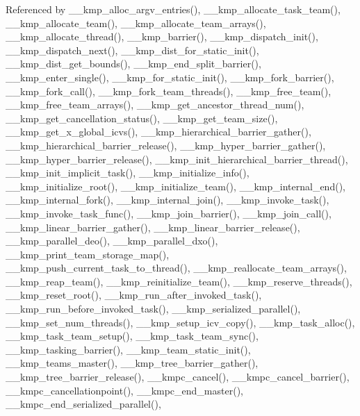 Referenced by \-\_\-\-\_\-kmp\-\_\-alloc\-\_\-argv\-\_\-entries(), \-\_\-\-\_\-kmp\-\_\-allocate\-\_\-task\-\_\-team(), \-\_\-\-\_\-kmp\-\_\-allocate\-\_\-team(), \-\_\-\-\_\-kmp\-\_\-allocate\-\_\-team\-\_\-arrays(), \-\_\-\-\_\-kmp\-\_\-allocate\-\_\-thread(), \-\_\-\-\_\-kmp\-\_\-barrier(), \-\_\-\-\_\-kmp\-\_\-dispatch\-\_\-init(), \-\_\-\-\_\-kmp\-\_\-dispatch\-\_\-next(), \-\_\-\-\_\-kmp\-\_\-dist\-\_\-for\-\_\-static\-\_\-init(), \-\_\-\-\_\-kmp\-\_\-dist\-\_\-get\-\_\-bounds(), \-\_\-\-\_\-kmp\-\_\-end\-\_\-split\-\_\-barrier(), \-\_\-\-\_\-kmp\-\_\-enter\-\_\-single(), \-\_\-\-\_\-kmp\-\_\-for\-\_\-static\-\_\-init(), \-\_\-\-\_\-kmp\-\_\-fork\-\_\-barrier(), \-\_\-\-\_\-kmp\-\_\-fork\-\_\-call(), \-\_\-\-\_\-kmp\-\_\-fork\-\_\-team\-\_\-threads(), \-\_\-\-\_\-kmp\-\_\-free\-\_\-team(), \-\_\-\-\_\-kmp\-\_\-free\-\_\-team\-\_\-arrays(), \-\_\-\-\_\-kmp\-\_\-get\-\_\-ancestor\-\_\-thread\-\_\-num(), \-\_\-\-\_\-kmp\-\_\-get\-\_\-cancellation\-\_\-status(), \-\_\-\-\_\-kmp\-\_\-get\-\_\-team\-\_\-size(), \-\_\-\-\_\-kmp\-\_\-get\-\_\-x\-\_\-global\-\_\-icvs(), \-\_\-\-\_\-kmp\-\_\-hierarchical\-\_\-barrier\-\_\-gather(), \-\_\-\-\_\-kmp\-\_\-hierarchical\-\_\-barrier\-\_\-release(), \-\_\-\-\_\-kmp\-\_\-hyper\-\_\-barrier\-\_\-gather(), \-\_\-\-\_\-kmp\-\_\-hyper\-\_\-barrier\-\_\-release(), \-\_\-\-\_\-kmp\-\_\-init\-\_\-hierarchical\-\_\-barrier\-\_\-thread(), \-\_\-\-\_\-kmp\-\_\-init\-\_\-implicit\-\_\-task(), \-\_\-\-\_\-kmp\-\_\-initialize\-\_\-info(), \-\_\-\-\_\-kmp\-\_\-initialize\-\_\-root(), \-\_\-\-\_\-kmp\-\_\-initialize\-\_\-team(), \-\_\-\-\_\-kmp\-\_\-internal\-\_\-end(), \-\_\-\-\_\-kmp\-\_\-internal\-\_\-fork(), \-\_\-\-\_\-kmp\-\_\-internal\-\_\-join(), \-\_\-\-\_\-kmp\-\_\-invoke\-\_\-task(), \-\_\-\-\_\-kmp\-\_\-invoke\-\_\-task\-\_\-func(), \-\_\-\-\_\-kmp\-\_\-join\-\_\-barrier(), \-\_\-\-\_\-kmp\-\_\-join\-\_\-call(), \-\_\-\-\_\-kmp\-\_\-linear\-\_\-barrier\-\_\-gather(), \-\_\-\-\_\-kmp\-\_\-linear\-\_\-barrier\-\_\-release(), \-\_\-\-\_\-kmp\-\_\-parallel\-\_\-deo(), \-\_\-\-\_\-kmp\-\_\-parallel\-\_\-dxo(), \-\_\-\-\_\-kmp\-\_\-print\-\_\-team\-\_\-storage\-\_\-map(), \-\_\-\-\_\-kmp\-\_\-push\-\_\-current\-\_\-task\-\_\-to\-\_\-thread(), \-\_\-\-\_\-kmp\-\_\-reallocate\-\_\-team\-\_\-arrays(), \-\_\-\-\_\-kmp\-\_\-reap\-\_\-team(), \-\_\-\-\_\-kmp\-\_\-reinitialize\-\_\-team(), \-\_\-\-\_\-kmp\-\_\-reserve\-\_\-threads(), \-\_\-\-\_\-kmp\-\_\-reset\-\_\-root(), \-\_\-\-\_\-kmp\-\_\-run\-\_\-after\-\_\-invoked\-\_\-task(), \-\_\-\-\_\-kmp\-\_\-run\-\_\-before\-\_\-invoked\-\_\-task(), \-\_\-\-\_\-kmp\-\_\-serialized\-\_\-parallel(), \-\_\-\-\_\-kmp\-\_\-set\-\_\-num\-\_\-threads(), \-\_\-\-\_\-kmp\-\_\-setup\-\_\-icv\-\_\-copy(), \-\_\-\-\_\-kmp\-\_\-task\-\_\-alloc(), \-\_\-\-\_\-kmp\-\_\-task\-\_\-team\-\_\-setup(), \-\_\-\-\_\-kmp\-\_\-task\-\_\-team\-\_\-sync(), \-\_\-\-\_\-kmp\-\_\-tasking\-\_\-barrier(), \-\_\-\-\_\-kmp\-\_\-team\-\_\-static\-\_\-init(), \-\_\-\-\_\-kmp\-\_\-teams\-\_\-master(), \-\_\-\-\_\-kmp\-\_\-tree\-\_\-barrier\-\_\-gather(), \-\_\-\-\_\-kmp\-\_\-tree\-\_\-barrier\-\_\-release(), \-\_\-\-\_\-kmpc\-\_\-cancel(), \-\_\-\-\_\-kmpc\-\_\-cancel\-\_\-barrier(), \-\_\-\-\_\-kmpc\-\_\-cancellationpoint(), \-\_\-\-\_\-kmpc\-\_\-end\-\_\-master(), \-\_\-\-\_\-kmpc\-\_\-end\-\_\-serialized\-\_\-parallel(), 
